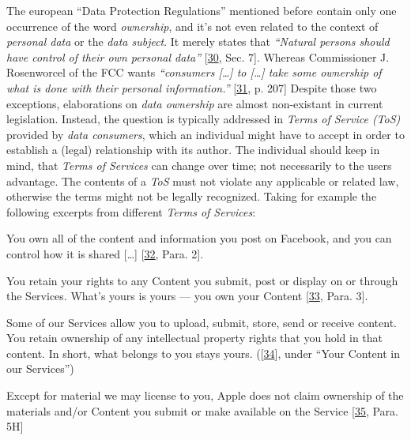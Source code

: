 \documentclass[12pt,english,a4paper,titlepage,cleardoublepage=empty,dottedtoc]{report}
\let\origquote\quote
\let\endorigquote\endquote
\renewenvironment{quote}{%
    \origquote
    \itshape
}
{\endorigquote}
\begin{document}
The european ``Data Protection Regulations'' mentioned before contain
only one occurrence of the word \emph{ownership}, and it's not even
related to the context of \emph{personal data} or the \emph{data
subject}. It merely states that \emph{``Natural persons should have
control of their own personal data''}
{[}\protect\hyperlink{ref-regulation_2016_eu_general-data-protection-regulation_ownership}{30},
Sec. 7{]}. Whereas Commissioner J. Rosenworcel of the FCC wants
\emph{``consumers {[}\ldots{}{]} to {[}\ldots{}{]} take some ownership
of what is done with their personal information.''}
{[}\protect\hyperlink{ref-rules_2016_fcc_to-protect-broadband-consumer-privacy_ownership}{31},
p. 207{]} Despite those two exceptions, elaborations on \emph{data
ownership} are almost non-existant in current legislation. Instead, the
question is typically addressed in \emph{Terms of Service (ToS)}
provided by \emph{data consumers}, which an individual might have to
accept in order to establish a (legal) relationship with its author. The
individual should keep in mind, that \emph{Terms of Services} can change
over time; not necessarily to the users advantage. The contents of a
\emph{ToS} must not violate any applicable or related law, otherwise the
terms might not be legally recognized. Taking for example the following
excerpts from different \emph{Terms of Services}:

\begin{quote}
You own all of the content and information you post on Facebook, and you
can control how it is shared {[}\ldots{}{]}
{[}\protect\hyperlink{ref-web_2016_facebook_terms-of-service}{32}, Para.
2{]}.
\end{quote}

\begin{quote}
You retain your rights to any Content you submit, post or display on or
through the Services. What's yours is yours --- you own your Content
{[}\protect\hyperlink{ref-web_2016_twitter_terms-of-service}{33}, Para.
3{]}.
\end{quote}

\begin{quote}
Some of our Services allow you to upload, submit, store, send or receive
content. You retain ownership of any intellectual property rights that
you hold in that content. In short, what belongs to you stays yours.
({[}\protect\hyperlink{ref-web_2016_google_terms-of-service}{34}{]},
under ``Your Content in our Services'')
\end{quote}

\begin{quote}
Except for material we may license to you, Apple does not claim
ownership of the materials and/or Content you submit or make available
on the Service
{[}\protect\hyperlink{ref-web_2016_apple-icloud_terms-of-service}{35},
Para. 5H{]}
\end{quote}
\end{document}
